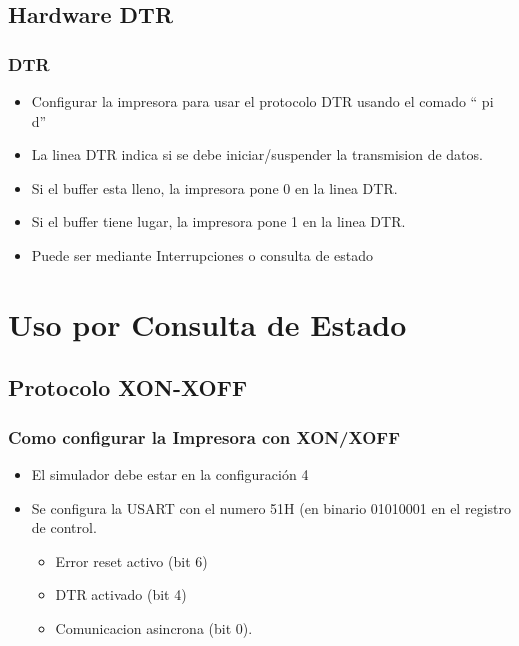 \documentclass{beamer}
\begin{document}
\subsection{Hardware DTR}
\begin{frame}[fragile]
\frametitle{DTR}
\begin{itemize}
 \item Configurar la impresora para usar el protocolo DTR usando el comado `` pi d'' 
 \item La linea DTR indica si se debe iniciar/suspender la transmision de datos.
 \item Si el buffer esta lleno, la impresora pone 0 en la linea DTR.
 \item Si el buffer tiene lugar, la impresora pone 1 en la linea DTR.
 \item Puede ser mediante Interrupciones o consulta de estado
\end{itemize}

\end{frame}


\section{Uso por Consulta de Estado}

\subsection{Protocolo XON-XOFF}

\begin{frame}[fragile]
\frametitle{Como configurar la Impresora con XON/XOFF}
\begin{itemize}
 \item El simulador debe estar en la configuración 4
 \item Se configura la USART con el numero 51H (en binario 01010001 en el registro de control.
 \begin{itemize}
 \item Error reset activo (bit 6)
 \item DTR activado (bit 4)
 \item Comunicacion asincrona (bit 0). 
\end{itemize}

 \end{itemize}
\end{frame}
\end{document}
